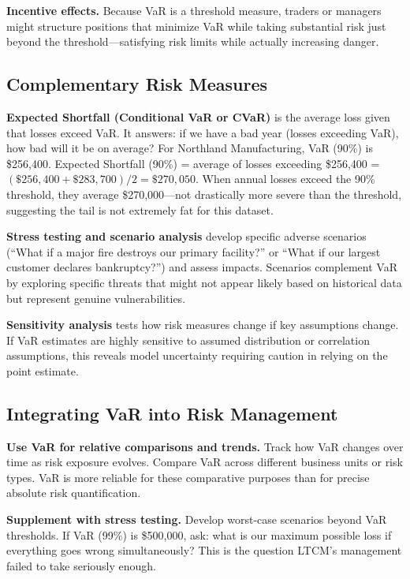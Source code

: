 \documentclass[11pt,openany]{book}
\begin{document}
\textbf{Incentive effects.} Because VaR is a threshold measure, traders or
managers might structure positions that minimize VaR while taking substantial
risk just beyond the threshold---satisfying risk limits while actually
increasing danger.

\subsection{Complementary Risk Measures}
\label{subsec:complementary-measures}

\textbf{Expected Shortfall (Conditional VaR or CVaR)} is the average loss given
that losses exceed VaR. It answers: if we have a bad year (losses exceeding
VaR), how bad will it be on average? For Northland Manufacturing, VaR (90\%) is
\$256,400. Expected Shortfall (90\%) = average of losses exceeding \$256,400 =
\((\$256{,}400 + \$283{,}700) / 2 = \$270{,}050\). When annual losses exceed
the 90\% threshold, they average \$270,000---not drastically more severe than
the threshold, suggesting the tail is not extremely fat for this dataset.

\textbf{Stress testing and scenario analysis} develop specific adverse scenarios
(``What if a major fire destroys our primary facility?'' or ``What if our
largest customer declares bankruptcy?'') and assess impacts. Scenarios
complement VaR by exploring specific threats that might not appear likely based
on historical data but represent genuine vulnerabilities.

\textbf{Sensitivity analysis} tests how risk measures change if key assumptions
change. If VaR estimates are highly sensitive to assumed distribution or
correlation assumptions, this reveals model uncertainty requiring caution in
relying on the point estimate.

\subsection{Integrating VaR into Risk Management}
\label{subsec:var-integration}

\textbf{Use VaR for relative comparisons and trends.} Track how VaR changes
over time as risk exposure evolves. Compare VaR across different business units
or risk types. VaR is more reliable for these comparative purposes than for
precise absolute risk quantification.

\textbf{Supplement with stress testing.} Develop worst-case scenarios beyond
VaR thresholds. If VaR (99\%) is \$500,000, ask: what is our maximum possible
loss if everything goes wrong simultaneously? This is the question LTCM's
management failed to take seriously enough.
\end{document}
